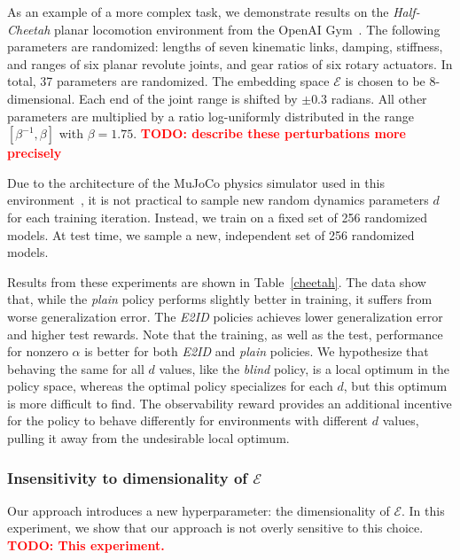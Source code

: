 \documentclass{article}
\newcommand{\TODO}[1]{\textcolor{red}{\textbf{TODO: #1}}}
\newcommand{\blind}{\emph{blind}}
\newcommand{\plain}{\emph{plain}}
\newcommand{\embed}{\emph{E2ID}}
\newcommand{\idvar}{d}
\newcommand{\latset}{\mathcal{E}}
\begin{document}
As an example of a more complex task, we demonstrate results on the \emph{Half-Cheetah}
planar locomotion environment from the OpenAI Gym~\citep{openai-gym}.
The following parameters are randomized:
lengths of seven kinematic links,
damping, stiffness, and ranges of six planar revolute joints,
and gear ratios of six rotary actuators.
In total, 37 parameters are randomized.
The embedding space $\latset$ is chosen to be 8-dimensional.
Each end of the joint range is shifted by $\pm 0.3$ radians.
All other parameters are multiplied by a ratio log-uniformly distributed in the range $[\beta^{-1}, \beta]$ with $\beta = 1.75$.
\TODO{describe these perturbations more precisely}

Due to the architecture of the MuJoCo physics simulator used in this environment~\citep{todorov-mujoco},
it is not practical to sample new random dynamics parameters $\idvar$ for each training iteration.
Instead, we train on a fixed set of 256 randomized models.
At test time, we sample a new, independent set of 256 randomized models.

Results from these experiments are shown in Table~\ref{cheetah}.
The data show that, while the \plain{} policy performs slightly better in training,
it suffers from worse generalization error.
The \embed{} policies achieves lower generalization error and higher test rewards.
Note that the training, as well as the test, performance for nonzero $\alpha$
is better for both \embed{} and \plain{} policies.
We hypothesize that behaving the same for all $\idvar$ values, like the \blind{} policy,
is a local optimum in the policy space,
whereas the optimal policy specializes for each $\idvar$,
but this optimum is more difficult to find.
The observability reward provides an additional incentive
for the policy to behave differently for environments with different $\idvar$ values,
pulling it away from the undesirable local optimum.

\subsubsection{Insensitivity to dimensionality of $\latset$}
Our approach introduces a new hyperparameter: the dimensionality of $\latset$.
In this experiment, we show that our approach is not overly sensitive to this choice.
\TODO{This experiment.}
\end{document}
